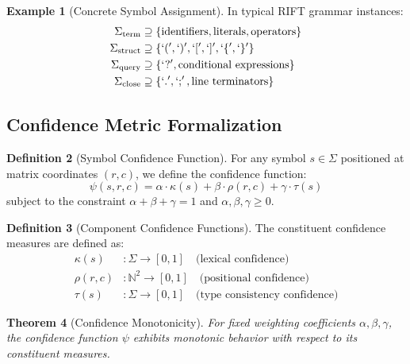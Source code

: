 \documentclass[11pt,a4paper]{article}
\newtheorem{theorem}{Theorem}[section]
\theoremstyle{definition}
\newtheorem{definition}[theorem]{Definition}
\newtheorem{example}[theorem]{Example}
\theoremstyle{remark}
\newcommand{\confidence}[3]{\ensuremath{\psi(#1, #2, #3)}}
\begin{document}
\begin{example}[Concrete Symbol Assignment]
In typical RIFT grammar instances:
\begin{align}
\Sigma_{\text{term}} &\supseteq \{\text{identifiers}, \text{literals}, \text{operators}\} \\
\Sigma_{\text{struct}} &\supseteq \{`(', `)', `[', `]', `\{', `\}'\} \\
\Sigma_{\text{query}} &\supseteq \{`?', \text{conditional expressions}\} \\
\Sigma_{\text{close}} &\supseteq \{`.', `;', \text{line terminators}\}
\end{align}
\end{example}

\subsection{Confidence Metric Formalization}
\label{subsec:confidence-metrics}

\begin{definition}[Symbol Confidence Function]
For any symbol $s \in \Sigma$ positioned at matrix coordinates $(r,c)$, we define the confidence function:
\begin{equation}
\confidence{s}{r}{c} = \alpha \cdot \kappa(s) + \beta \cdot \rho(r,c) + \gamma \cdot \tau(s)
\end{equation}
subject to the constraint $\alpha + \beta + \gamma = 1$ and $\alpha, \beta, \gamma \geq 0$.
\end{definition}

\begin{definition}[Component Confidence Functions]
The constituent confidence measures are defined as:
\begin{align}
\kappa(s) &: \Sigma \to [0,1] \quad \text{(lexical confidence)} \\
\rho(r,c) &: \mathbb{N}^2 \to [0,1] \quad \text{(positional confidence)} \\
\tau(s) &: \Sigma \to [0,1] \quad \text{(type consistency confidence)}
\end{align}
\end{definition}

\begin{theorem}[Confidence Monotonicity]
\label{thm:confidence-monotonicity}
For fixed weighting coefficients $\alpha, \beta, \gamma$, the confidence function $\psi$ exhibits monotonic behavior with respect to its constituent measures.
\end{theorem}
\end{document}
